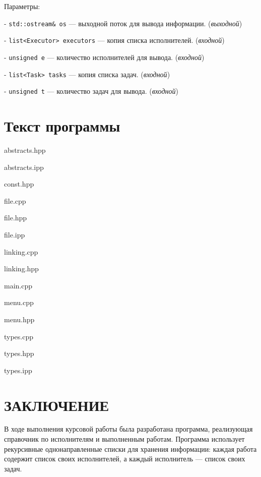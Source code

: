 \documentclass[12pt,a4paper]{extarticle}
\begin{document}
Параметры:


- \texttt{std::ostream\& os} — выходной поток для вывода информации. (\textit{выходной})

- \texttt{list<Executor> executors} — копия списка исполнителей. (\textit{входной})

- \texttt{unsigned e} — количество исполнителей для вывода. (\textit{входной})

- \texttt{list<Task> tasks} — копия списка задач. (\textit{входной})

- \texttt{unsigned t} — количество задач для вывода. (\textit{входной})

\section{Текст программы}

abstracts.hpp

abstracts.ipp

const.hpp

file.cpp

file.hpp

file.ipp

linking.cpp

linking.hpp

main.cpp

menu.cpp

menu.hpp

types.cpp

types.hpp

types.ipp


\newpage

\section*{ЗАКЛЮЧЕНИЕ}
В ходе выполнения курсовой работы была разработана программа,
реализующая справочник по исполнителям и выполненным работам.
Программа использует рекурсивные однонаправленные списки для
хранения информации: каждая работа содержит список своих
исполнителей, а каждый исполнитель — список своих задач.

\medskip
\end{document}
